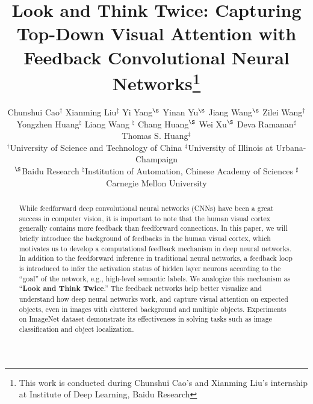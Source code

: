 \documentclass[10pt,twocolumn,letterpaper]{article}
\begin{document}
\title{Look and Think Twice: Capturing Top-Down Visual Attention with Feedback Convolutional Neural Networks\thanks{This work is conducted during Chunshui Cao's and Xianming Liu's internship at Institute of Deep Learning, Baidu Research }}


\author{Chunshui Cao$^\dag$ \;\; Xianming Liu$^\ddag$ \;\; Yi Yang$^\S$ \;\; Yinan Yu$^\S$ \;\; Jiang Wang$^\S$ \;\; Zilei Wang$^\dag$ \;\; \\
Yongzhen Huang$^\natural$ \;\; Liang Wang $^\natural$ \;\; Chang Huang$^\S$ \;\; Wei Xu$^\S$ \;\; Deva Ramanan$^\sharp$ \;\; Thomas S. Huang$^\ddag$ \\
$^\dag$University of Science and Technology of China \quad
$^\ddag$University of Illinois at Urbana-Champaign\\
$^\S$Baidu Research \quad %
$^\natural$Institution of Automation, Chinese Academy of Sciences \quad
$^\sharp$Carnegie Mellon University
}

\maketitle


\begin{abstract}
While feedforward deep convolutional neural networks (CNNs) have been a great success in computer vision, it is important to note that the human visual cortex generally contains more feedback than feedforward connections.
In this paper, we will briefly introduce the background of feedbacks in the human visual cortex, which motivates us to develop a computational feedback mechanism in deep neural networks.
In addition to the feedforward inference in traditional neural networks, a feedback loop is introduced to infer the activation status of hidden layer neurons according to the ``goal'' of the network, e.g., high-level semantic labels.
We analogize this mechanism as ``\textbf{Look and Think Twice}.''
The feedback networks help better visualize and understand how deep neural networks work, and capture visual attention on expected objects, even in images with cluttered background and multiple objects.
Experiments on ImageNet dataset demonstrate its effectiveness in solving tasks such as image classification and object localization.
\end{abstract}
\end{document}
